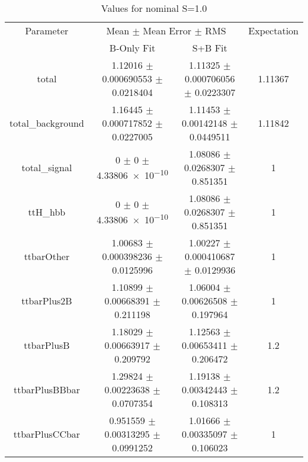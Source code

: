 \begin{table}
\centering
\caption{Values for nominal S=1.0}
\begin{tabular}{cccc}
\toprule
Parameter & \multicolumn{2}{c}{Mean $\pm$ Mean Error $\pm$ RMS} & Expectation\\
 & B-Only Fit & S+B Fit & \\
\midrule
total & \num{1.12016} $\pm$ \num{0.000690553} $\pm$ \num{0.0218404} & \num{1.11325} $\pm$ \num{0.000706056} $\pm$ \num{0.0223307} & \num{1.11367}\\
total\_background & \num{1.16445} $\pm$ \num{0.000717852} $\pm$ \num{0.0227005} & \num{1.11453} $\pm$ \num{0.00142148} $\pm$ \num{0.0449511} & \num{1.11842}\\
total\_signal & \num{0} $\pm$ \num{0} $\pm$ \num{4.33806e-10} & \num{1.08086} $\pm$ \num{0.0268307} $\pm$ \num{0.851351} & \num{1}\\
ttH\_hbb & \num{0} $\pm$ \num{0} $\pm$ \num{4.33806e-10} & \num{1.08086} $\pm$ \num{0.0268307} $\pm$ \num{0.851351} & \num{1}\\
ttbarOther & \num{1.00683} $\pm$ \num{0.000398236} $\pm$ \num{0.0125996} & \num{1.00227} $\pm$ \num{0.000410687} $\pm$ \num{0.0129936} & \num{1}\\
ttbarPlus2B & \num{1.10899} $\pm$ \num{0.00668391} $\pm$ \num{0.211198} & \num{1.06004} $\pm$ \num{0.00626508} $\pm$ \num{0.197964} & \num{1}\\
ttbarPlusB & \num{1.18029} $\pm$ \num{0.00663917} $\pm$ \num{0.209792} & \num{1.12563} $\pm$ \num{0.00653411} $\pm$ \num{0.206472} & \num{1.2}\\
ttbarPlusBBbar & \num{1.29824} $\pm$ \num{0.00223638} $\pm$ \num{0.0707354} & \num{1.19138} $\pm$ \num{0.00342443} $\pm$ \num{0.108313} & \num{1.2}\\
ttbarPlusCCbar & \num{0.951559} $\pm$ \num{0.00313295} $\pm$ \num{0.0991252} & \num{1.01666} $\pm$ \num{0.00335097} $\pm$ \num{0.106023} & \num{1}\\
\bottomrule
\end{tabular}
\end{table}